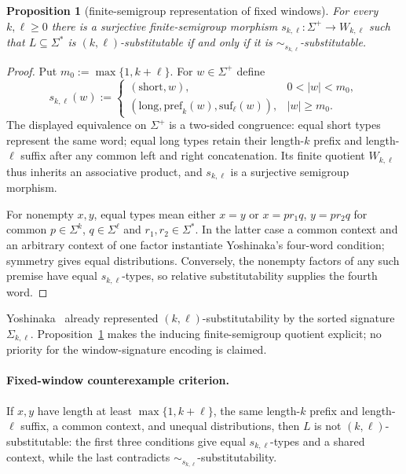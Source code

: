 \documentclass[11pt,a4paper]{article}
\newtheorem{proposition}[theorem]{Proposition}
\theoremstyle{remark}
\theoremstyle{plain}
\newcommand{\pref}{\mathrm{pref}}
\newcommand{\suf}{\mathrm{suf}}
\begin{document}
\begin{proposition}[finite-semigroup representation of fixed windows]
\label{prop:yl-special}
For every $k,\ell\ge0$ there is a surjective
finite-semigroup morphism $s_{k,\ell}:\Sigma^+\to W_{k,\ell}$
such that $L\subseteq\Sigma^*$ is $(k,\ell)$-substitutable
if and only if it is $\sim_{s_{k,\ell}}$-substitutable.
\end{proposition}
\begin{proof}
Put $m_0:=\max\{1,k+\ell\}$. For $w\in\Sigma^+$ define
\[
s_{k,\ell}(w):=
\begin{cases}
(\mathrm{short},w),&0<|w|<m_0,\\
(\mathrm{long},\pref_k(w),\suf_\ell(w)),&|w|\ge m_0.
\end{cases}
\]
The displayed equivalence on $\Sigma^+$ is a two-sided
congruence: equal short types represent the same word;
equal long types retain their length-$k$ prefix and
length-$\ell$ suffix after any common left and right
concatenation. Its finite quotient $W_{k,\ell}$ thus
inherits an associative product, and $s_{k,\ell}$
is a surjective semigroup morphism.

For nonempty $x,y$, equal types mean either $x=y$
or $x=pr_1q$, $y=pr_2q$ for common
$p\in\Sigma^k$, $q\in\Sigma^\ell$ and
$r_1,r_2\in\Sigma^*$. In the latter case a common
context and an arbitrary context of one factor
instantiate Yoshinaka's four-word condition;
symmetry gives equal distributions.
Conversely, the nonempty factors of any such
premise have equal $s_{k,\ell}$-types, so relative
substitutability supplies the fourth word.
\end{proof}

Yoshinaka~\cite[Example~4]{yoshinaka2015} already represented
$(k,\ell)$-substitutability by the sorted signature $\Sigma_{k,\ell}$.
Proposition~\ref{prop:yl-special} makes the inducing finite-semigroup
quotient explicit; no priority for the window-signature encoding is claimed.

\label{crit:kl}
\paragraph{Fixed-window counterexample criterion.}
If $x,y$ have length at least $\max\{1,k+\ell\}$, the same length-$k$
prefix and length-$\ell$ suffix, a common context, and unequal
distributions, then $L$ is not $(k,\ell)$-substitutable: the first
three conditions give equal $s_{k,\ell}$-types and a shared context, while
the last contradicts $\sim_{s_{k,\ell}}$-substitutability.
\end{document}
